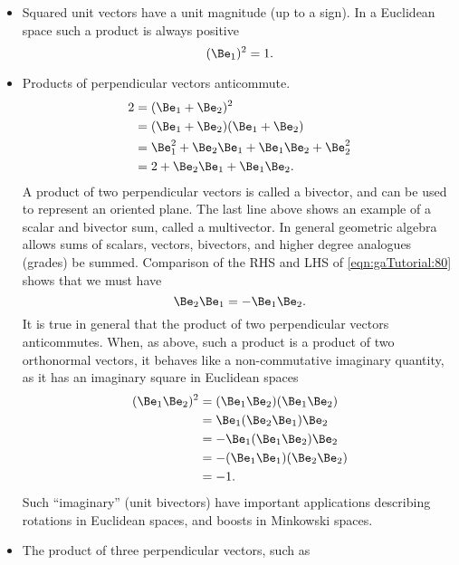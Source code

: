 \begin{itemize}
\item Squared unit vectors have a unit magnitude (up to a sign).  In a Euclidean space such a product is always positive
%
\begin{equation}\label{eqn:gaTutorial:60}
(\Be_1)^2 = 1.
\end{equation}
%
\item Products of perpendicular vectors anticommute.
%
\begin{equation}\label{eqn:gaTutorial:80}
\begin{aligned}
2
&=
(\Be_1 + \Be_2)^2
\\ &= (\Be_1 + \Be_2)(\Be_1 + \Be_2)
\\ &= \Be_1^2 + \Be_2 \Be_1 + \Be_1 \Be_2 + \Be_2^2
\\ &= 2 + \Be_2 \Be_1 + \Be_1 \Be_2.
\end{aligned}
\end{equation}
%
A product of two perpendicular vectors is called a bivector, and can be used to represent an oriented plane.  The last line above shows an example of a scalar and bivector sum, called a multivector.  In general geometric algebra allows sums of scalars, vectors, bivectors, and higher degree analogues (grades) be summed.
%
Comparison of the RHS and LHS of \cref{eqn:gaTutorial:80} shows that we must have
%
\begin{equation}\label{eqn:gaTutorial:100}
\Be_2 \Be_1 = -\Be_1 \Be_2.
\end{equation}
%
It is true in general that the product of two perpendicular vectors anticommutes.  When, as above, such a product is a product of
two orthonormal vectors, it behaves like a non-commutative imaginary quantity, as it has an imaginary square in Euclidean spaces
%
\begin{equation}\label{eqn:gaTutorial:120}
\begin{aligned}
(\Be_1 \Be_2)^2
&=
(\Be_1 \Be_2)
(\Be_1 \Be_2)
\\ &=
\Be_1 (\Be_2
\Be_1) \Be_2
\\ &=
-\Be_1 (\Be_1
\Be_2) \Be_2
\\ &=
-(\Be_1 \Be_1)
(\Be_2 \Be_2)
\\ &=-1.
\end{aligned}
\end{equation}
%
Such ``imaginary'' (unit bivectors) have important applications describing rotations in Euclidean spaces, and boosts in Minkowski spaces.
%
\item
The product of three perpendicular vectors, such as

\end{itemize}

